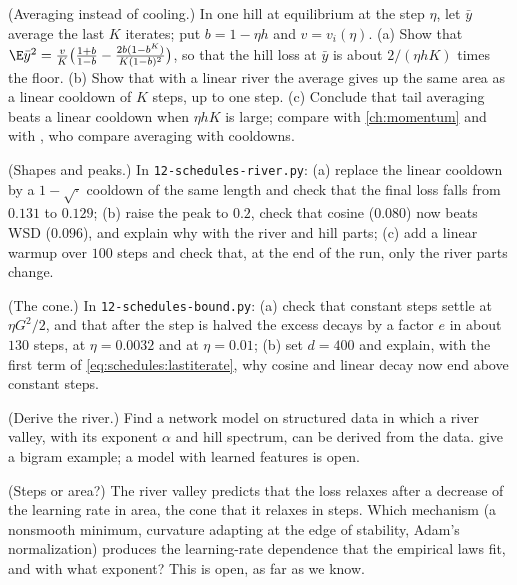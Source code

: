 \begin{refsection}
\begin{exercises}
\item \variation (Averaging instead of cooling.) In one hill at equilibrium at the step $\eta$, let $\bar y$ average the last $K$ iterates; put $b=1-\eta h$ and $v=v_i(\eta)$. (a) Show that $\E\bar y^2=\frac vK\bigl(\frac{1+b}{1-b}-\frac{2b(1-b^K)}{K(1-b)^2}\bigr)$, so that the hill loss at $\bar y$ is about $2/(\eta hK)$ times the floor. (b) Show that with a linear river the average gives up the same area as a linear cooldown of $K$ steps, up to one step. (c) Conclude that tail averaging beats a linear cooldown when $\eta hK$ is large; compare with \cref{ch:momentum} and with \textcite{HageleEtAl2024}, who compare averaging with cooldowns.\label{ex:schedules:averaging}

\item \simulation (Shapes and peaks.) In \texttt{12-schedules-river.py}: (a) replace the linear cooldown by a $1-\sqrt\cdot$ cooldown of the same length and check that the final loss falls from $0.131$ to $0.129$; (b) raise the peak to $0.2$, check that cosine ($0.080$) now beats WSD ($0.096$), and explain why with the river and hill parts; (c) add a linear warmup over $100$ steps and check that, at the end of the run, only the river parts change.\label{ex:schedules:sim1}

\item \simulation (The cone.) In \texttt{12-schedules-bound.py}: (a) check that constant steps settle at $\eta G^2/2$, and that after the step is halved the excess decays by a factor $e$ in about $130$ steps, at $\eta=0.0032$ and at $\eta=0.01$; (b) set $d=400$ and explain, with the first term of \eqref{eq:schedules:lastiterate}, why cosine and linear decay now end above constant steps.\label{ex:schedules:sim2}

\item \research (Derive the river.) Find a network model on structured data in which a river valley, with its exponent $\alpha$ and hill spectrum, can be derived from the data. \Textcite{WenEtAl2025} give a bigram example; a model with learned features is open.\label{ex:schedules:derive}

\item \research (Steps or area?) The river valley predicts that the loss relaxes after a decrease of the learning rate in area, the cone that it relaxes in steps. Which mechanism (a nonsmooth minimum, curvature adapting at the edge of stability, Adam's normalization) produces the learning-rate dependence that the empirical laws fit, and with what exponent? This is open, as far as we know.\label{ex:schedules:relax}
\end{exercises}


\end{refsection}
